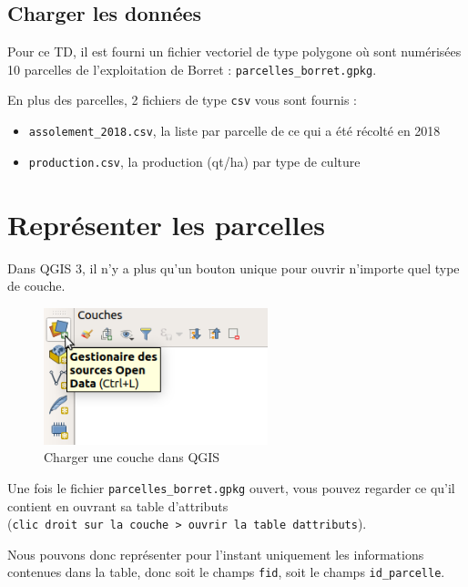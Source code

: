 \hypertarget{charger-les-donnuxe9es}{%
\subsection{Charger les données}\label{charger-les-donnuxe9es}}

Pour ce TD, il est fourni un fichier vectoriel de type polygone où sont
numérisées 10 parcelles de l'exploitation de Borret :
\texttt{parcelles\_borret.gpkg}.

En plus des parcelles, 2 fichiers de type \texttt{csv} vous sont fournis
:

\begin{itemize}
\tightlist
\item
  \texttt{assolement\_2018.csv}, la liste par parcelle de ce qui a été
  récolté en 2018
\item
  \texttt{production.csv}, la production (qt/ha) par type de culture
\end{itemize}

\hypertarget{repruxe9senter-les-parcelles}{%
\section{Représenter les parcelles}\label{repruxe9senter-les-parcelles}}

Dans QGIS 3, il n'y a plus qu'un bouton unique pour ouvrir n'importe
quel type de couche.

\begin{figure}
\centering
\includegraphics[width=\textwidth,height=1.5625in]{figures/QGIS_charger.png}
\caption{Charger une couche dans QGIS}
\end{figure}

Une fois le fichier \texttt{parcelles\_borret.gpkg} ouvert, vous pouvez
regarder ce qu'il contient en ouvrant sa table d'attributs
(\texttt{clic\ droit\ sur\ la\ couche\ \textgreater{}\ ouvrir\ la\ table\ d\textquotesingle{}attributs}).

Nous pouvons donc représenter pour l'instant uniquement les informations
contenues dans la table, donc soit le champs \texttt{fid}, soit le
champs \texttt{id\_parcelle}.

